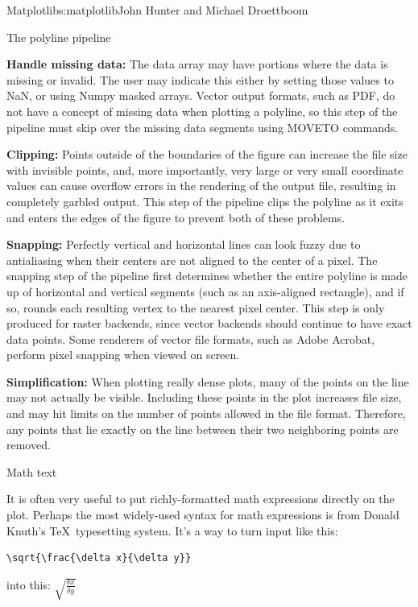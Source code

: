 \begin{aosachapter}{Matplotlib}{s:matplotlib}{John Hunter and Michael Droettboom}
\begin{aosasect1}{The polyline pipeline}
\begin{aosaenumerate}
\item \textbf{Handle missing data:} The data array may have portions
  where the data is missing or invalid.  The user may indicate this
  either by setting those values to NaN, or using Numpy masked arrays.
  Vector output formats, such as PDF, do not have a concept of missing
  data when plotting a polyline, so this step of the pipeline must
  skip over the missing data segments using MOVETO commands.

\item \textbf{Clipping:} Points outside of the boundaries of the
  figure can increase the file size with invisible points, and, more
  importantly, very large or very small coordinate values can cause
  overflow errors in the rendering of the output file, resulting in
  completely garbled output.  This step of the pipeline clips the
  polyline as it exits and enters the edges of the figure to prevent
  both of these problems.

\item \textbf{Snapping:} Perfectly vertical and horizontal lines can
  look fuzzy due to antialiasing when their centers are not aligned to
  the center of a pixel.  The snapping step of the pipeline first
  determines whether the entire polyline is made up of horizontal and
  vertical segments (such as an axis-aligned rectangle), and if so,
  rounds each resulting vertex to the nearest pixel center.  This step
  is only produced for raster backends, since vector backends should
  continue to have exact data points.  Some renderers of vector file
  formats, such as Adobe Acrobat, perform pixel snapping when viewed
  on screen.

\item \textbf{Simplification:} When plotting really dense plots, many
  of the points on the line may not actually be visible.  Including
  these points in the plot increases file size, and may hit limits on
  the number of points allowed in the file format.  Therefore, any
  points that lie exactly on the line between their two neighboring
  points are removed.

\end{aosaenumerate}


\end{aosasect1}

\begin{aosasect1}{Math text}

It is often very useful to put richly-formatted math expressions
directly on the plot.  Perhaps the most widely-used syntax for math
expressions is from Donald Knuth's \TeX\ typesetting system.  It's a
way to turn input like this:
\begin{verbatim}
\sqrt{\frac{\delta x}{\delta y}}
\end{verbatim}
into this:
\begin{math}
\sqrt{\frac{\delta x}{\delta y}}
\end{math}


\end{aosasect1}
\end{aosachapter}
